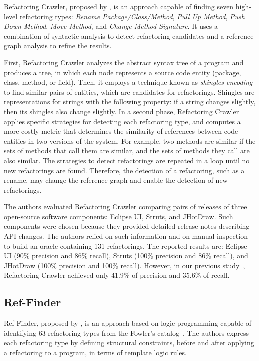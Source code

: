 Refactoring Crawler, proposed by \cite{dig2006automated}, is an approach capable of finding seven high-level refactoring types: \emph{Rename Package/Class/Method}, \emph{Pull Up Method}, \emph{Push Down Method}, \emph{Move Method}, and \emph{Change Method Signature}.
It uses a combination of syntactic analysis to detect refactoring candidates and a reference graph analysis to refine the results.

First, Refactoring Crawler analyzes the abstract syntax tree of a program and produces a tree, in which each node represents a source code entity (package, class, method, or field).
Then, it employs a technique known as \emph{shingles encoding} to find 
similar pairs of entities, which are candidates for refactorings.
Shingles are representations for strings with the following property: if a string changes slightly, then its shingles also change slightly.
In a second phase, Refactoring Crawler applies specific strategies for detecting each refactoring type, and computes a more costly metric that determines the similarity of references between code entities in two versions of the system. For example, two methods are similar if the sets of methods that call them are similar, and the sets of methods they call are also similar.
The strategies to detect refactorings are repeated in a loop until no new refactorings are found. Therefore, the detection of a refactoring, such as a rename, may change the reference graph and enable the detection of new refactorings.

The authors evaluated Refactoring Crawler comparing pairs of releases of three open-source software components: Eclipse UI, Struts, and JHotDraw. Such components were chosen because they provided detailed release notes describing API changes. The authors relied on such information and on manual inspection to build an oracle
containing 131 refactorings.
The reported results are: Eclipse UI (90\% precision and 86\% recall), Struts (100\% precision and 86\% recall), and JHotDraw (100\% precision and 100\% recall).
However, in our previous study~\citep{msr2017}, Refactoring Crawler achieved only 41.9\% of precision and 35.6\% of recall.

\subsection{Ref-Finder}

Ref-Finder, proposed by \cite{prete2010template,Kim:2010:RefFinder}, is an approach based on logic programming capable of identifying 63 refactoring types from the Fowler's catalog~\citep{Fowler:1999}.
The authors express each refactoring type by defining structural constraints, before and after applying a refactoring to a program, in terms of template logic rules.

